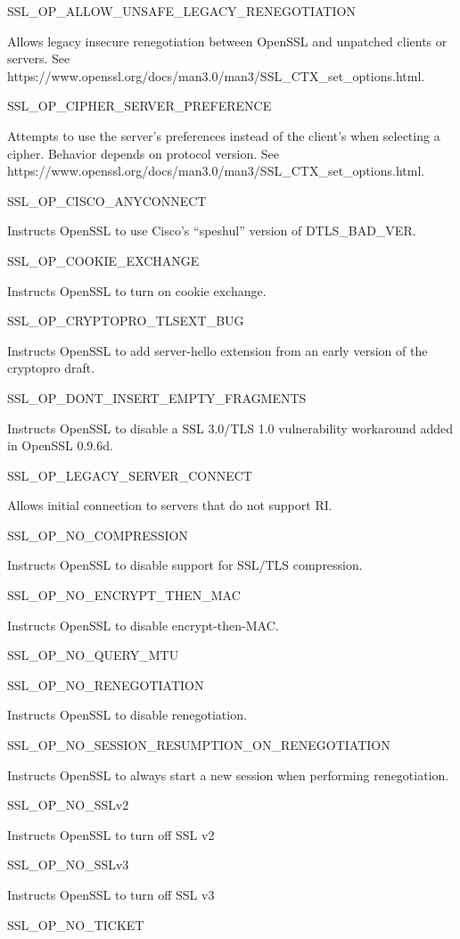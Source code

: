 SSL\_OP\_ALLOW\_UNSAFE\_LEGACY\_RENEGOTIATION

Allows legacy insecure renegotiation between OpenSSL and unpatched
clients or servers. See
https://www.openssl.org/docs/man3.0/man3/SSL\_CTX\_set\_options.html.

SSL\_OP\_CIPHER\_SERVER\_PREFERENCE

Attempts to use the server's preferences instead of the client's when
selecting a cipher. Behavior depends on protocol version. See
https://www.openssl.org/docs/man3.0/man3/SSL\_CTX\_set\_options.html.

SSL\_OP\_CISCO\_ANYCONNECT

Instructs OpenSSL to use Cisco's ``speshul'' version of DTLS\_BAD\_VER.

SSL\_OP\_COOKIE\_EXCHANGE

Instructs OpenSSL to turn on cookie exchange.

SSL\_OP\_CRYPTOPRO\_TLSEXT\_BUG

Instructs OpenSSL to add server-hello extension from an early version of
the cryptopro draft.

SSL\_OP\_DONT\_INSERT\_EMPTY\_FRAGMENTS

Instructs OpenSSL to disable a SSL 3.0/TLS 1.0 vulnerability workaround
added in OpenSSL 0.9.6d.

SSL\_OP\_LEGACY\_SERVER\_CONNECT

Allows initial connection to servers that do not support RI.

SSL\_OP\_NO\_COMPRESSION

Instructs OpenSSL to disable support for SSL/TLS compression.

SSL\_OP\_NO\_ENCRYPT\_THEN\_MAC

Instructs OpenSSL to disable encrypt-then-MAC.

SSL\_OP\_NO\_QUERY\_MTU

SSL\_OP\_NO\_RENEGOTIATION

Instructs OpenSSL to disable renegotiation.

SSL\_OP\_NO\_SESSION\_RESUMPTION\_ON\_RENEGOTIATION

Instructs OpenSSL to always start a new session when performing
renegotiation.

SSL\_OP\_NO\_SSLv2

Instructs OpenSSL to turn off SSL v2

SSL\_OP\_NO\_SSLv3

Instructs OpenSSL to turn off SSL v3

SSL\_OP\_NO\_TICKET

